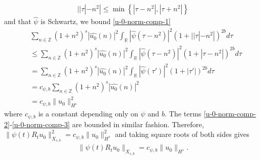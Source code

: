 \documentclass[12pt,reqno]{amsart}
\numberwithin{equation}{section}  %
\numberwithin{figure}{section}
\newcommand{\rr}{\mathbb{R}}
\newcommand{\zz}{\mathbb{Z}}
\newcommand{\wh}{\widehat}
\theoremstyle{plain}
\theoremstyle{definition}
\theoremstyle{remark}
\begin{document}
\begin{equation}
  \begin{split}
    | | \tau | - n^{2} | \le \min\left\{ | \tau - n^{2} |, | \tau + n^{2} | \right\}
  \end{split}
  \label{eqn:norm-key-ineq}
\end{equation}
%
%
and that $\wh{\psi}$ is Schwartz, we bound \eqref{u-0-norm-comp-1}  
%
%
\begin{equation*}
  \begin{split}
    & \sum_{n \in \zz} \left( 1 + n^{2} \right)^{s} | \wh{u_{0}}(n)
    |^{2} \int_{\rr} | \wh{\psi}(\tau - n^{2}) |^{2}\left( 1 + | | \tau | -
    n^{2} | \right)^{2b} d \tau
    \\
    & \le  \sum_{n \in \zz} \left( 1 + n^{2} \right)^{s} | \wh{u_{0}}(n)
    |^{2} \int_{\rr} | \wh{\psi}(\tau - n^{2}) |^{2}\left( 1 +  | \tau  -
    n^{2} | \right)^{2b} d \tau
    \\
    & = \sum_{n \in \zz} \left( 1 + n^{2} \right)^{s} | \wh{u_{0}}(n)
    |^{2} \int_{\rr} | \wh{\psi}(\tau') |^{2}\left( 1 +  | \tau'| \right)^{2b} d \tau
    \\
    & = c_{\psi, b} \sum_{n \in \zz} \left( 1 + n^{2} \right)^{s} | \wh{u_{0}}(n)
    |^{2} 
    \\
    & = c_{\psi, b} \| u_{0} \|_{H^{s}}^{2}
  \end{split}
\end{equation*}
%
%
where $c_{\psi, b}$ is a constant depending only on $\psi$ and $b$. The
terms \eqref{u-0-norm-comp-2}-\eqref{u-0-norm-comp-3} are bounded in similar fashion. Therefore, 
$\|\psi(t) R_{t} u_{0}\|_{X_{s,b}}^{2} = c_{\psi, b}
\|u_{0}\|_{H^s}^2$ and
taking square roots of both sides gives
%
%
\begin{equation}
  \begin{split}
    \|\psi(t) R_{t} u_{0}\|_{X_{s,b}} = c_{\psi, b}
    \|u_{0}\|_{H^s}.
  \end{split}
  \label{eqn:u-0-fin-est}
\end{equation}
%
%
\end{document}
